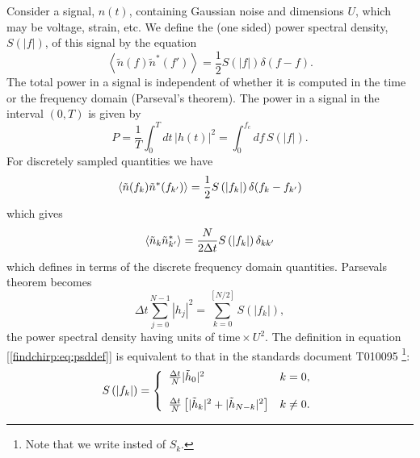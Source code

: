 Consider a signal, $n(t)$, containing Gaussian noise and dimensions $U$, which
may be voltage, strain, etc. We define the (one sided) power spectral density,
$S(|f|)$, of this signal by the equation
\begin{equation}
\left\langle\tilde{n}(f) \tilde{n}^\ast(f')\right\rangle = 
\frac{1}{2}S\left(\left|f\right|\right)\delta(f-f).
\end{equation}
The total power in a signal is independent of whether it is computed in the
time or the frequency domain (Parseval's theorem). The power in a signal in
the interval $(0,T)$  is given by
\begin{equation}
P = \frac{1}{T} \int_{0}^{T} dt\, \left|h(t)\right|^2 = 
\int_{0}^{f_c} df\, S\left(\left|f\right|\right).
\end{equation}
For discretely sampled quantities we have
\begin{equation}
\left\langle\tilde{n}(f_k) \tilde{n}^\ast(f_{k'})\right\rangle = 
\frac{1}{2}S\left(\left|f_{k}\right|\right)\delta(f_k-f_{k'})
\end{equation}
which gives
\begin{equation}
\label{findchirp:eq:ospsddef}
\left\langle\tilde{n}_k \tilde{n}_{k'}^\ast\right\rangle = 
\frac{N}{2\Delta t}S\left(\left|f_{k}\right|\right)\delta_{kk'}
\end{equation}
which defines \ospsd in terms of the discrete frequency domain quantities.
Parsevals theorem becomes
\begin{equation}
\Delta t \sum_{j=0}^{N-1} |h_j|^2 
= \sum_{k=0}^{[N/2]} S\left(\left|f_k\right|\right),
\end{equation}
the power spectral density having units of $\textrm{time}\times U^2$. The
definition in equation [\ref{findchirp:eq:psddef}] is equivalent to that in
the standards document T010095%
\footnote{Note that we write \ospsd insted of $S_k$.}:
\begin{equation}
S\left(\left|f_{k}\right|\right) = \left\{
\begin{array}{ll}
\frac{\Delta t}{N} | \tilde{h}_0 |^2 & k = 0, \\
\\
\frac{\Delta t}{N} \left[ | \tilde{h}_k |^2 + | \tilde{h}_{N-k} |^2 \right] &
k\neq 0.
\end{array}
\right.
\end{equation}

\newpage
\newpage
\newpage
\newpage
\newpage
\newpage
